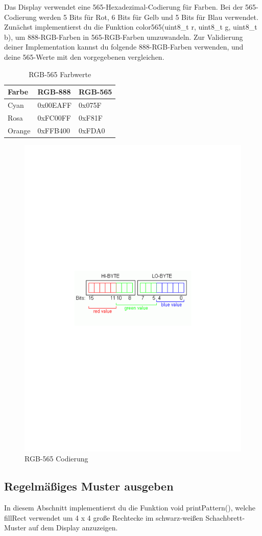 Das Display verwendet eine 565-Hexadezimal-Codierung für Farben. Bei der 565-Codierung werden 5 Bits für Rot, 6 Bits für Gelb und 5 Bits für Blau verwendet.
Zunächst implementierst du die Funktion color565(uint8\_t r, uint8\_t g, uint8\_t b), um 888-RGB-Farben in 565-RGB-Farben umzuwandeln. Zur Validierung deiner Implementation kannst du folgende 888-RGB-Farben verwenden, und deine 565-Werte mit den vorgegebenen vergleichen.

\begin{table}[]
	\centering
	\caption{RGB-565 Farbwerte}
	\label{rgb565Table}
	\begin{tabular}{|l|l|l|}
		\hline
		\textbf{Farbe} & \textbf{RGB-888} & \textbf{RGB-565} \\ \hline
		Cyan & 0x00EAFF & 0x075F \\ \hline
		Rosa & 0xFC00FF & 0xF81F \\ \hline
		Orange & 0xFFB400 & 0xFDA0 \\ \hline
	\end{tabular}
\end{table}

\begin{figure}
	\begin{centering}
		\includegraphics[width=.5\textwidth]{./05_c/figures/rgb565}
		\caption{RGB-565 Codierung}
		\label{fig:rgb565}
	\end{centering}
\end{figure}


\subsection{Regelmäßiges Muster ausgeben}
In diesem Abschnitt implementierst du die Funktion void printPattern(), welche fillRect verwendet um 4 x 4 große Rechtecke im schwarz-weißen Schachbrett-Muster auf dem Display anzuzeigen.
